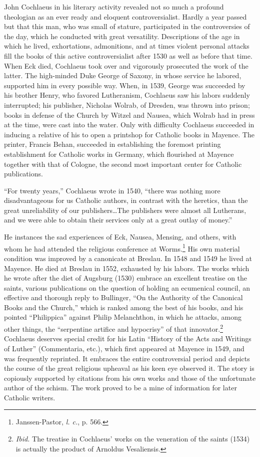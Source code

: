 John Cochlaeus in his literary activity revealed not so much a
profound theologian as an ever ready and eloquent controversialist.
Hardly a year passed but that this man, who was small of stature,
participated in the controversies of the day, which he conducted with
great versatility. Descriptions of the age in which he lived, exhortations,
admonitions, and at times violent personal attacks fill the books
of this active controversialist after 1530 as well as before that time.
When Eck died, Cochlaeus took over and vigorously prosecuted the
work of the latter. The high-minded Duke George of Saxony, in whose
service he labored, supported him in every possible way. When, in
1539, George was succeeded by his brother Henry, who favored Lutheranism,
Cochlaeus saw his labors suddenly interrupted; his publisher, Nicholas
Wolrab, of Dresden, was thrown into prison; books in
defense of the Church by Witzel and Nausea, which Wolrab had in
press at the time, were cast into the water. Only with difficulty
Cochlaeus succeeded in inducing a relative of his to open a printshop
for Catholic books in Mayence. The printer, Francis Behan,
succeeded in establishing the foremost printing establishment for
Catholic works in Germany, which flourished at Mayence together
with that of Cologne, the second most important center for Catholic
publications.

“For twenty years,” Cochlaeus wrote in 1540, “there was nothing
more disadvantageous for us Catholic authors, in contrast with the
heretics, than the great unreliability of our publishers\dots The publishers
were almost all Lutherans, and we were able to obtain their
services only at a great outlay of money.”

He instances the sad experiences of Eck, Nausea, Mensing, and
others, with whom he had attended the religious conference at
Worms.\footnote{Janssen-Pastor, \textit{l. c.}, p. 566.}
 His own material condition was improved by a canonicate
at Breslau. In 1548 and 1549 he lived at Mayence. He died at
Breslau in 1552, exhausted by his labors. The works which he wrote
after the diet of Augsburg (1530) embrace an excellent treatise on
the saints, various publications on the question of holding an ecumenical
council, an effective and thorough reply to Bullinger, “On
the Authority of the Canonical Books and the Church,” which is
ranked among the best of his books, and his pointed “Philippica”
against Philip Melanchthon, in which he attacks, among other things,
the “serpentine artifice and hypocrisy” of that innovator.\footnote{\textit{Ibid.} The treatise in Cochlaeus’ works on the veneration of the saints (1534) is
actually the product of Arnoldus Vesaliensis.}
Cochlaeus
deserves special credit for his Latin “History of the Acts and Writings
of Luther” (Commentaria, etc.), which first appeared at Mayence in 1549,
and was frequently reprinted. It embraces the entire
controversial period and depicts the course of the great religious upheaval
as his keen eye observed it. The story is copiously supported by
citations from his own works and those of the unfortunate author of
the schism. The work proved to be a mine of information for later
Catholic writers.


